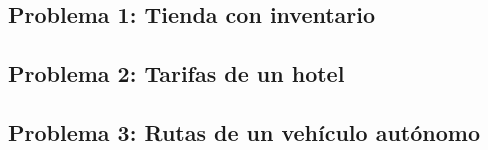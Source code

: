 \documentclass[12pt]{article}
\begin{document}
\thispagestyle{fancy}

\subsection*{Problema 1: Tienda con inventario}


\newpage
\subsection*{Problema 2: Tarifas de un hotel}


\newpage
\subsection*{Problema 3: Rutas de un vehículo autónomo}

\end{document}
